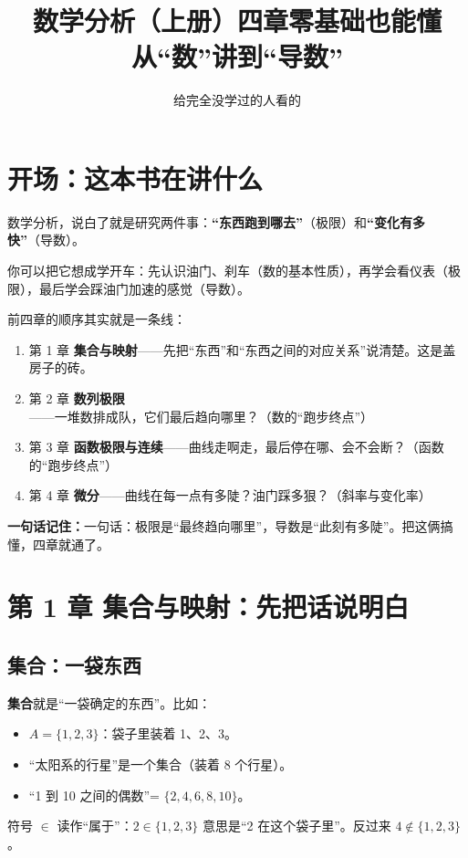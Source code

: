 ﻿\documentclass[11pt,a4paper,UTF8]{ctexart}
\title{数学分析（上册）四章\quad 零基础也能懂\\[4pt]\large 从“数”讲到“导数”}
\author{给完全没学过的人看的}
\date{}
\newcommand{\idea}[1]{\par\smallskip\noindent\colorbox{yellow!22}{\textbf{一句话记住：}#1}\par\smallskip}
\begin{document}
\maketitle
\tableofcontents\newpage

\section{开场：这本书在讲什么}

数学分析，说白了就是研究两件事：\textbf{“东西跑到哪去”}（极限）和\textbf{“变化有多快”}（导数）。

你可以把它想成学开车：先认识油门、刹车（数的基本性质），再学会看仪表（极限），最后学会踩油门加速的感觉（导数）。

前四章的顺序其实就是一条线：
\begin{enumerate}[leftmargin=1.4em]
\item 第 1 章 \textbf{集合与映射}——先把“东西”和“东西之间的对应关系”说清楚。这是盖房子的砖。
\item 第 2 章 \textbf{数列极限}——一堆数排成队，它们最后趋向哪里？（数的“跑步终点”）
\item 第 3 章 \textbf{函数极限与连续}——曲线走啊走，最后停在哪、会不会断？（函数的“跑步终点”）
\item 第 4 章 \textbf{微分}——曲线在每一点有多陡？油门踩多狠？（斜率与变化率）
\end{enumerate}

\idea{一句话：极限是“最终趋向哪里”，导数是“此刻有多陡”。把这俩搞懂，四章就通了。}

\section{第 1 章 集合与映射：先把话说明白}

\subsection{集合：一袋东西}

\textbf{集合}就是“一袋确定的东西”。比如：
\begin{itemize}[leftmargin=1.4em]
\item $A=\{1,2,3\}$：袋子里装着 1、2、3。
\item “太阳系的行星”是一个集合（装着 8 个行星）。
\item “1 到 10 之间的偶数”= $\{2,4,6,8,10\}$。
\end{itemize}

符号 $\in$ 读作“属于”：$2\in\{1,2,3\}$ 意思是“2 在这个袋子里”。反过来 $4\notin\{1,2,3\}$。
\end{document}

